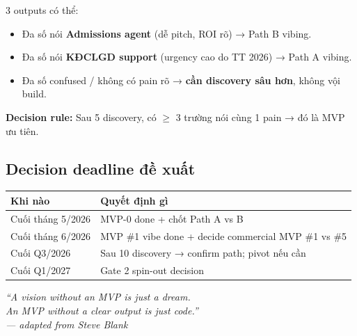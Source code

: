 \documentclass[11pt,a4paper]{article}
\begin{document}
3 outputs có thể:
\begin{itemize}
\item Đa số nói \textbf{Admissions agent} (dễ pitch, ROI rõ) → Path B vibing.
\item Đa số nói \textbf{KĐCLGD support} (urgency cao do TT 2026) → Path A vibing.
\item Đa số confused / không có pain rõ → \textbf{cần discovery sâu hơn}, không vội build.
\end{itemize}

\textbf{Decision rule:} Sau 5 discovery, có $\geq$ 3 trường nói cùng 1 pain → đó là MVP ưu tiên.

\subsection{Decision deadline đề xuất}

\begin{tabularx}{\linewidth}{@{}p{2cm} X@{}}
\toprule
\textbf{Khi nào} & \textbf{Quyết định gì} \\
\midrule
Cuối tháng 5/2026 & MVP-0 done + chốt Path A vs B \\
Cuối tháng 6/2026 & MVP \#1 vibe done + decide commercial MVP \#1 vs \#5 \\
Cuối Q3/2026 & Sau 10 discovery → confirm path; pivot nếu cần \\
Cuối Q1/2027 & Gate 2 spin-out decision \\
\bottomrule
\end{tabularx}

\vfill

\begin{center}
\small\itshape\color{mid}
``A vision without an MVP is just a dream.\\
An MVP without a clear output is just code.''\\
--- adapted from Steve Blank
\end{center}
\end{document}
